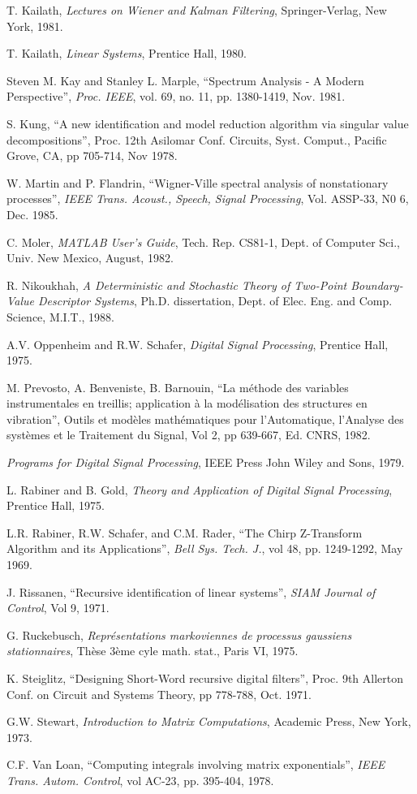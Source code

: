 \begin{thebibliography}{99}
 T. Kailath, {\em Lectures on Wiener and Kalman Filtering}, Springer-Verlag, New York, 1981.

 T. Kailath, {\em Linear Systems}, Prentice Hall, 1980.

 Steven M. Kay and Stanley L. Marple, ``Spectrum Analysis - A Modern Perspective'', {\em Proc. IEEE}, vol. 69, no. 11, pp. 1380-1419, Nov. 1981.

 S. Kung, ``A new identification and model reduction algorithm via singular value decompositions'', Proc. 12th Asilomar Conf. Circuits, Syst. Comput., Pacific Grove, CA, pp 705-714, Nov 1978.


 W. Martin and P. Flandrin, ``Wigner-Ville spectral analysis of nonstationary processes'', {\em IEEE Trans. Acoust., Speech, Signal Processing}, Vol. ASSP-33, N0 6, Dec. 1985.

  C. Moler, {\em MATLAB User's  Guide},  Tech.  Rep.  CS81-1, Dept.  of Computer Sci., Univ.  New Mexico, August, 1982.


 R. Nikoukhah, {\em A Deterministic and Stochastic Theory of Two-Point Boundary-Value Descriptor Systems}, Ph.D. dissertation, Dept. of Elec. Eng. and Comp. Science, M.I.T., 1988.

 A.V. Oppenheim and R.W. Schafer, {\em Digital Signal Processing}, Prentice Hall, 1975.

 M. Prevosto, A. Benveniste, B. Barnouin, ``La m\'ethode des variables instrumentales en treillis; application \`a la mod\'elisation des structures en vibration'', Outils et mod\`eles math\'ematiques pour l'Automatique, l'Analyse des syst\`emes et le Traitement du Signal, Vol 2, pp 639-667, Ed. CNRS, 1982.

 {\em Programs for Digital Signal Processing}, IEEE Press John Wiley and Sons, 1979.

 L. Rabiner and B. Gold, {\em Theory and Application of Digital Signal Processing}, Prentice Hall, 1975.

 L.R. Rabiner, R.W. Schafer, and C.M. Rader, ``The Chirp Z-Transform Algorithm and its Applications'', {\em Bell Sys. Tech. J.}, vol 48, pp. 1249-1292, May 1969.

 J. Rissanen, ``Recursive identification of linear systems'', {\em SIAM Journal of Control}, Vol 9, 1971.

 G. Ruckebusch, {\em Repr\'esentations markoviennes de processus gaussiens stationnaires}, Th\`ese 3\`eme cyle math. stat., Paris VI, 1975.

 K. Steiglitz, ``Designing Short-Word recursive digital filters'', Proc. 9th Allerton Conf. on Circuit and Systems Theory, pp 778-788, Oct. 1971.

 G.W. Stewart, {\em Introduction to Matrix Computations}, Academic Press, New York, 1973.

 C.F. Van Loan,  ``Computing integrals involving matrix exponentials'', {\em IEEE Trans. Autom. Control}, vol AC-23, pp. 395-404, 1978.

\end{thebibliography}
